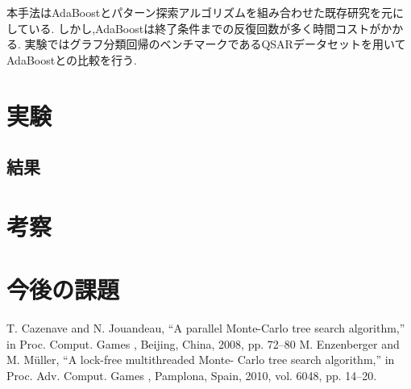 \documentclass{zasshi-prml3}
\begin{document}
本手法はAdaBoostとパターン探索アルゴリズムを組み合わせた既存研究を元にしている.
しかし,AdaBoostは終了条件までの反復回数が多く時間コストがかかる.
実験ではグラフ分類回帰のベンチマークであるQSARデータセットを用いてAdaBoostとの比較を行う.

\section{実験}

\subsection{結果}

\section{考察}

\section{今後の課題}

\begin{thebibliography}{9}
T. Cazenave and N. Jouandeau, “A
parallel Monte-Carlo tree search
algorithm,” in
Proc. Comput. Games
, Beijing, China, 2008, pp. 72–80
M. Enzenberger and M. Müller, “A
lock-free multithreaded Monte-
Carlo tree search algorithm,” in
Proc. Adv. Comput. Games
, Pamplona,
Spain, 2010, vol. 6048, pp. 14–20.
\end{thebibliography}
\end{document}
